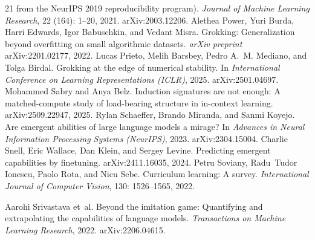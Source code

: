 \documentclass[11pt]{article}
\theoremstyle{plain}
\theoremstyle{definition}
\begin{document}
\begin{thebibliography}{21}
  from the {NeurIPS} 2019 reproducibility program).
\newblock \emph{Journal of Machine Learning Research}, 22
  (164): 1--20, 2021.
\newblock arXiv:2003.12206.
\newblock {}
Alethea Power, Yuri Burda, Harri Edwards, Igor Babuschkin, and Vedant Misra.
\newblock Grokking: Generalization beyond overfitting on small algorithmic
  datasets.
\newblock \emph{arXiv preprint} arXiv:2201.02177, 2022.
\newblock {}
Lucas Prieto, Melih Barsbey, Pedro A.~M. Mediano, and Tolga Birdal.
\newblock Grokking at the edge of numerical stability.
\newblock In \emph{International Conference on Learning Representations
  (ICLR)}, 2025.
\newblock arXiv:2501.04697.
\newblock {}
Mohammed Sabry and Anya Belz.
\newblock Induction signatures are not enough: A matched-compute study of
  load-bearing structure in in-context learning.
\newblock arXiv:2509.22947, 2025.
\newblock {}
Rylan Schaeffer, Brando Miranda, and Sanmi Koyejo.
\newblock Are emergent abilities of large language models a mirage?
\newblock In \emph{Advances in Neural Information Processing Systems
  (NeurIPS)}, 2023.
\newblock arXiv:2304.15004.
\newblock {}
Charlie Snell, Eric Wallace, Dan Klein, and Sergey Levine.
\newblock Predicting emergent capabilities by finetuning.
\newblock arXiv:2411.16035, 2024.
\newblock {}
Petru Soviany, Radu~Tudor Ionescu, Paolo Rota, and Nicu Sebe.
\newblock Curriculum learning: A survey.
\newblock \emph{International Journal of Computer Vision}, 130:
  1526--1565, 2022.
\newblock {}

Aarohi Srivastava et~al.
\newblock Beyond the imitation game: Quantifying and extrapolating the
  capabilities of language models.
\newblock \emph{Transactions on Machine Learning Research}, 2022.
  arXiv:2206.04615.
\newblock {}


\end{thebibliography}
\end{document}
